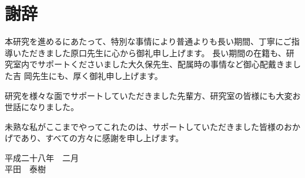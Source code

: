 \chapter*{謝辞}
本研究を進めるにあたって、特別な事情により普通よりも長い期間、丁寧にご指導いただきました原口先生に心から御礼申し上げます。
長い期間の在籍も、研究室内でサポートくださいました大久保先生、配属時の事情など御心配戴きました吉
岡先生にも、厚く御礼申し上げます。

研究を様々な面でサポートしていただきました先輩方、研究室の皆様にも大変お世話になりました。

未熟な私がここまでやってこれたのは、サポートしていただきました皆様のおかげであり、すべての方々に感謝を申し上げます。

\begin{flushright}
  平成二十八年　二月 \\
      平田　泰樹
\end{flushright}
